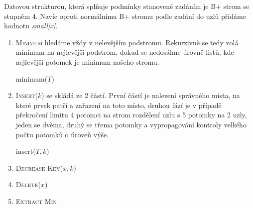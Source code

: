 \documentclass[12pt]{iv003}
\begin{document}
Datovou strukturou, která splňuje podmínky stanovené zadáním je B+ strom se stupněm 4. Navíc oproti normálnímu B+ stromu podle zadání do uzlů přidáme hodnotu \textit{small[x]}.
\begin{enumerate}
	\item \textsc{Minimum} hledáme vždy v nelevějším podstromu. Rekurzivně se tedy volá minimum na nejlevější podstrom, dokud se nedosáhne úrovně listů, kde nejlevější potomek je minimum našeho stromu.\\
	\begin{procedure}[H]
		\caption{minimum($T$) }
		 {
			 
		}
	\end{procedure}
	\item \textsc{Insert}($k$) se skládá ze 2 částí. První částí je nalezení správného místa, na které prvek patří a zařazení na toto místo, druhou fází je v případě překročení limitu 4 potomci na strom rozdělení uzlu s 5 potomky na 2 uzly, jeden se dvěma, druhý se třema potomky a vypropagování kontroly velkého počtu potomků o úroveň výše.\\
	\begin{procedure}[H]
		\caption{insert($T, k$) }
		\Output{}
	\end{procedure}
	\item \textsc{Decrease Key}($x,k$)
	\item \textsc{Delete}($x$)
	\item \textsc{Extract Min}
\end{enumerate}
\end{document}
